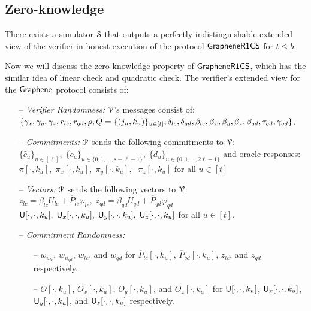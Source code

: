 \subsection{Zero-knowledge}\label{app:graphene_zk}

\begin{lemma}\label{lem:simgraphene}
	There exists a simulator $\mathcal{S}$ that outputs a perfectly indistinguishable extended view of the verifier in honest execution of the protocol $\mathsf{GrapheneR1CS}$ for $t\leq b$.
\end{lemma}
\noindent Now we will discuss the zero knowledge property of $\mathsf{GrapheneR1CS}$, which has the similar idea of linear check and quadratic check.
The verifier's extended view for the $\textsf{Graphene}$ protocol consists of:
\begin{itemize}
	\item[--] {\em Verifier Randomness:} $\mathcal{V}$'s messages consist of:	$\{\gamma_x, \gamma_y, \gamma_z, r_{lc}, r_{qd}, \rho, Q=\{(j_u,k_u)\}_{u\in[t]},\\ \delta_{lc}, \delta_{qd}, \beta_{lc}, \beta_x, \beta_y, \beta_z, \beta_{qd}, \tau_{qd}, \gamma_{qd}\}$.
	\item[--] {\em Commitments:} $\mathcal{P}$ sends the following commitments to $\mathcal{V}$:
	$\{\tilde{c_u}\}_{u\in[\ell]}, \; \{c_u\}_{u\in\{0, 1, \ldots, s+\ell-1 \} }, \; \{d_u\}_{u\in \{0, 1, \ldots, 2\ell-1\}}$
	and oracle responses:
	$ \pi[\cdot,k_u],\; \pi_x[\cdot,k_u],\; \pi_y[\cdot, k_u],$ $\; \pi_z[\cdot,k_u] $
	for all $u\in[t]$
	\item[--] {\em Vectors: } $\mathcal{P}$ sends the following vectors to $\mathcal{V}$:
	$z_{lc}=\beta_{lc} U_{lc}+\overline{P}_{lc}\varphi_{lc}, \; z_{qd}=\beta_{qd} U_{qd}+\overline{P}_{qd}\varphi_{qd}$\\
	$\mathsf{U}[\cdot,\cdot,k_u],\; \mathsf{U}_x[\cdot,\cdot,k_u],\; \mathsf{U}_y[\cdot, \cdot,k_u],\; \mathsf{U}_z[\cdot,\cdot,k_u]$ for all $u\in[t]$.
	\item[--] {\em Commitment Randomness: }
	\begin{itemize}
		\item[--] $w_{u_{lc}}$, $w_{u_{qd}}$, $w_{lc}$, and $w_{qd}$ for $\overline{P}_{lc}[\cdot,k_u]$, $\overline{P}_{qd}[\cdot,k_u]$, $z_{lc}$, and $z_{qd}$ respectively. 
		\item[--] $O[\cdot, k_u]$, $O_x[\cdot, k_u]$, $O_y[\cdot, k_u]$, and $O_z[\cdot, k_u]$ for $\mathsf{U}[\cdot,\cdot,k_u]$, $\mathsf{U}_x[\cdot,\cdot,k_u]$, $\mathsf{U}_y[\cdot,\cdot,k_u]$, and $\mathsf{U}_z[\cdot,\cdot,k_u]$ respectively.
	\end{itemize}
\end{itemize}


